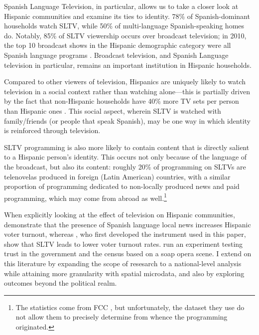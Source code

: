 \documentclass[11pt]{article}
\begin{document}
Spanish Language Television, in particular, allows us to take a closer look at Hispanic communities and examine its ties to identity. 78\% of Spanish-dominant households watch SLTV, while 50\% of multi-language Spanish-speaking homes do. Notably, 85\% of SLTV viewership occurs over broadcast television; in 2010, the top 10 broadcast shows in the Hispanic demographic category were all Spanish language programs \citep{pardo_three_2011}. Broadcast television, and Spanish Language television in particular, remains an important institution in Hispanic households. 
 
 Compared to other viewers of television, Hispanics are uniquely likely to watch television in a social context rather than watching alone---this is partially driven by the fact that non-Hispanic households have 40\% more TV sets per person than Hispanic ones \citep{coghill_tuning_2018}. This social aspect, wherein SLTV is watched with family/friends (or people that speak Spanish), may be one way in which identity is reinforced through television. 

SLTV programming is also more likely to contain content that is directly salient to a Hispanic person's identity. This occurs not only because of the language of the broadcast, but also its content: roughly 20\% of programming on SLTVs are telenovelas produced in foreign (Latin American) countries, with a similar proportion of programming dedicated to non-locally produced news and paid programming, which may come from abroad as well.\footnote{ The statistics come from FCC \cite{noauthor_hispanic_2016}, but unfortunately, the dataset they use do not allow them to precisely determine from whence the programming originated. }

When explicitly looking at the effect of television on Hispanic communities, \cite{oberholzer-gee_media_2009} demonstrate that the presence of Spanish language local news increases Hispanic voter turnout, whereas  \cite{velez_tuning_2019}, who first developed the instrument used in this paper, show that SLTV leads to lower voter turnout rates. \cite{trujillo_devil_2012} run an experiment testing trust in the government and the census based on a soap opera scene. I extend on this literature by expanding the scope of resesarch to a national-level analysis while attaining more granularity with spatial microdata, and also by exploring outcomes beyond the political realm.
\end{document}
